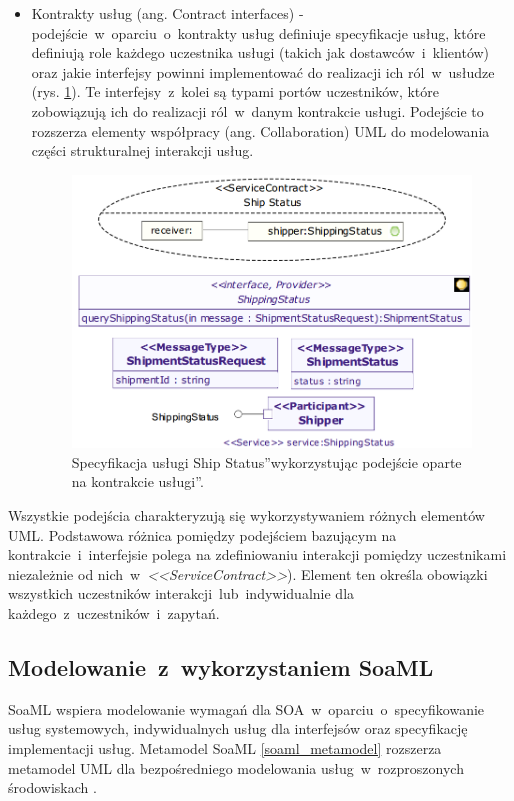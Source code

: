 \begin{itemize}
\item{Kontrakty usług (ang. Contract interfaces) - podejście~w~oparciu~o~kontrakty usług definiuje specyfikacje usług, które definiują role każdego uczestnika usługi (takich jak dostawców~i~klientów) oraz jakie interfejsy powinni implementować do realizacji ich ról~w~usłudze (rys. \ref{service_contract_based_approach}). Te interfejsy~z~kolei są typami portów uczestników, które zobowiązują ich do realizacji ról~w~danym kontrakcie usługi. Podejście to rozszerza elementy współpracy (ang. Collaboration) UML do modelowania części strukturalnej interakcji usług. 
\begin{figure}[h!tbp]
\begin{centering}
\includegraphics[width=11cm]{img/service_contract_based_approach.png}
\caption[Specyfikacja usługi \emph{Ship Status} wykorzystując podejście oparte na \quotedblbase kontrakcie usługi\textquotedblright. ]{Specyfikacja usługi \quotedblbase Ship Status\textquotedblright wykorzystując podejście oparte na \quotedblbase kontrakcie usługi\textquotedblright \cite{SoaMLErvBase}.}\label{service_contract_based_approach}
\end{centering}
\end{figure}
}
\end{itemize}

Wszystkie podejścia charakteryzują się wykorzystywaniem różnych elementów UML. Podstawowa różnica pomiędzy podejściem bazującym na kontrakcie~i~interfejsie polega na zdefiniowaniu interakcji pomiędzy uczestnikami niezależnie od nich~w~\emph{<<ServiceContract>>}). Element ten określa obowiązki wszystkich uczestników interakcji~lub~indywidualnie dla każdego~z~uczestników~i~zapytań. 

\subsection{Modelowanie~z~wykorzystaniem SoaML}
SoaML wspiera modelowanie wymagań dla SOA~w~oparciu~o~specyfikowanie usług systemowych, indywidualnych usług dla interfejsów oraz specyfikację implementacji usług. Metamodel SoaML \ref{soaml_metamodel} rozszerza metamodel UML dla bezpośredniego modelowania usług~w~rozproszonych środowiskach \cite{SoaMLErvBase}.

